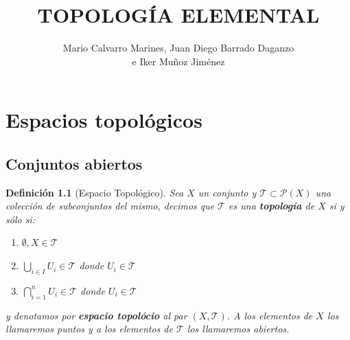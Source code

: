 \documentclass[10pt,a4paper,openright]{book}
\title{\Huge TOPOLOGÍA ELEMENTAL}
\author{Mario Calvarro Marines, Juan Diego Barrado Daganzo  \\
e Iker Muñoz Jiménez}
\date{}
\theoremstyle{break}
\newtheorem*{defi}{Definición}
\begin{document}
\maketitle
\setcounter{tocdepth}{3}%
\tableofcontents
\chapter{Espacios topológicos}
\label{cha:espacios_topologicos}

\section{Conjuntos abiertos}
\label{sec:conjuntos_abiertos}
\begin{defi}[Espacio Topológico]
Sea $X$ un conjunto y $\mathcal{T} \subset \mathcal{P}\left( X \right)$ una colección de subconjuntos del mismo, decimos que $\mathcal{T}$ es una \textbf{topología} de $X$ si y sólo si:
\begin{enumerate}
    \item $\emptyset, X \in \mathcal{T}$ 
    \item $\bigcup_{i \in I} U_i \in \mathcal{T}$ donde $U_i \in \mathcal{T}$
    \item $\bigcap_{i=1}^n U_i \in \mathcal{T}$ donde $U_i \in \mathcal{T}$
\end{enumerate}
y denotamos por \textbf{espacio topolócio} al par $\left( X, \mathcal{T} \right)$. A los elementos de $X$ los llamaremos puntos y a los elementos de $\mathcal{T}$ los llamaremos abiertos.
\end{defi}
\end{document}
